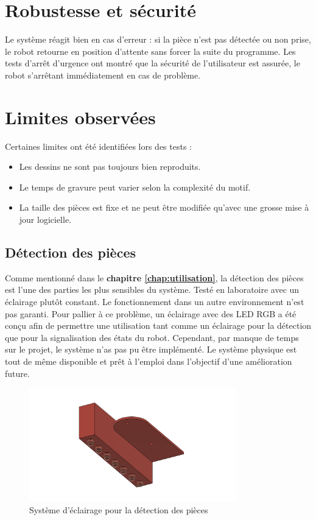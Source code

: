 \section{Robustesse et sécurité}

Le système réagit bien en cas d'erreur : si la pièce n'est pas détectée ou non prise, le robot retourne en position d'attente sans forcer la suite du programme. Les tests d'arrêt d'urgence ont montré que la sécurité de l'utilisateur est assurée, le robot s'arrêtant immédiatement en cas de problème.

\section{Limites observées}

Certaines limites ont été identifiées lors des tests :
\begin{itemize}
    \item Les dessins ne sont pas toujours bien reproduits.
    \item Le temps de gravure peut varier selon la complexité du motif.
    \item La taille des pièces est fixe et ne peut être modifiée qu'avec une grosse mise à jour logicielle.
\end{itemize}

\subsection{Détection des pièces}
Comme mentionné dans le \textbf{chapitre \ref{chap:utilisation}}, la détection des pièces est l'une des parties les plus sensibles du système. Testé en laboratoire avec un éclairage plutôt constant. Le fonctionnement dans un autre environnement n'est pas garanti. Pour pallier à ce problème, un éclairage avec des LED RGB a été conçu afin de permettre une utilisation tant comme un éclairage pour la détection que pour la signalisation des états du robot. Cependant, par manque de temps sur le projet, le système n'as pas pu être implémenté. Le système physique est tout de même disponible et prêt à l'emploi dans l'objectif d'une amélioration future.

\begin{figure}[H]
    \centering
    \includegraphics[width=0.8\textwidth]{assets/figures/porte led v3.png}
    \caption{Système d'éclairage pour la détection des pièces}
    \label{fig:led_detection}
\end{figure}


